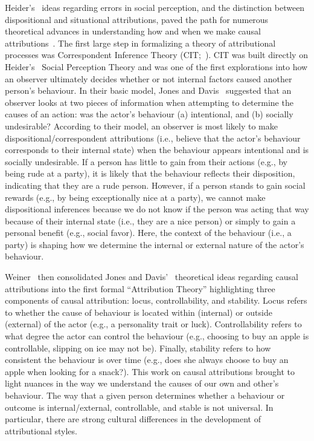 \documentclass{sfuthesis}
\begin{document}
Heider’s~\cite{heider58} ideas regarding errors in social perception, and the distinction between dispositional and situational attributions, paved the path for numerous theoretical advances in understanding how and when we make causal attributions~\cite{bem72, jones65, kelley67, kruglanski75, weiner85}. The first large step in formalizing a theory of attributional processes was Correspondent Inference Theory (CIT;~\cite{jones65}). CIT was built directly on Heider’s~\cite{heider58} Social Perception Theory and was one of the first explorations into how an observer ultimately decides whether or not internal factors caused another person’s behaviour. In their basic model, Jones and Davis~\cite{jones65} suggested that an observer looks at two pieces of information when attempting to determine the causes of an action: was the actor’s behaviour (a) intentional, and (b) socially undesirable? According to their model, an observer is most likely to make dispositional/correspondent attributions (i.e., believe that the actor’s behaviour corresponds to their internal state) when the behaviour appears intentional and is socially undesirable. If a person has little to gain from their actions (e.g., by being rude at a party), it is likely that the behaviour reflects their disposition, indicating that they are a rude person. However, if a person stands to gain social rewards (e.g., by being exceptionally nice at a party), we cannot make dispositional inferences because we do not know if the person was acting that way because of their internal state (i.e., they are a nice person) or simply to gain a personal benefit (e.g., social favor). Here, the context of the behaviour (i.e., a party) is shaping how we determine the internal or external nature of the actor’s behaviour.

Weiner~\cite{weiner85} then consolidated Jones and Davis’~\cite{jones65} theoretical ideas regarding causal attributions into the first formal “Attribution Theory” highlighting three components of causal attribution: locus, controllability, and stability. Locus refers to whether the cause of behaviour is located within (internal) or outside (external) of the actor (e.g., a personality trait or luck). Controllability refers to what degree the actor can control the behaviour (e.g., choosing to buy an apple is controllable, slipping on ice may not be). Finally, stability refers to how consistent the behaviour is over time (e.g., does she always choose to buy an apple when looking for a snack?). This work on causal attributions brought to light nuances in the way we understand the causes of our own and other’s behaviour. The way that a given person determines whether a behaviour or outcome is internal/external, controllable, and stable is not universal. In particular, there are strong cultural differences in the development of attributional styles.
\end{document}
